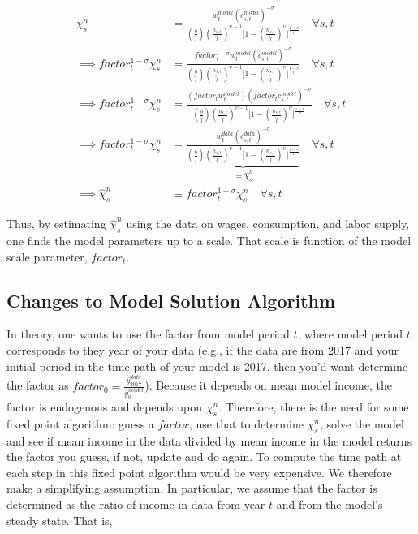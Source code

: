 \documentclass[letterpaper,12pt]{article}
\theoremstyle{definition}
\begin{document}
    \begin{equation}\label{EqChi_ns_model_algebra}
      \begin{split}
        \chi^n_s & = \frac{w^{model}_t\left(c^{model}_{s,t}\right)^{-\sigma}}{\left(\frac{b}{\tilde{l}}\right)\left(\frac{n_{s,t}}{\tilde{l}}\right)^{\upsilon-1}\Biggl[1 - \left(\frac{n_{s,t}}{\tilde{l}}\right)^\upsilon\Biggr]^{\frac{1-\upsilon}{\upsilon}}} \quad\forall s, t \\
        \implies factor^{1-\sigma}_{t} \chi^{n}_{s} & = \frac{factor^{1-\sigma}_{t}w^{model}_t\left(c^{model}_{s,t}\right)^{-\sigma}}{\left(\frac{b}{\tilde{l}}\right)\left(\frac{n_{s,t}}{\tilde{l}}\right)^{\upsilon-1}\Biggl[1 - \left(\frac{n_{s,t}}{\tilde{l}}\right)^\upsilon\Biggr]^{\frac{1-\upsilon}{\upsilon}}} \quad\forall s, t \\
        \implies factor^{1-\sigma}_{t} \chi^{n}_{s} & = \frac{\left(factor_{t}w^{model}_t\right)\left(factor_{t} c^{model}_{s,t}\right)^{-\sigma}}{\left(\frac{b}{\tilde{l}}\right)\left(\frac{n_{s,t}}{\tilde{l}}\right)^{\upsilon-1}\Biggl[1 - \left(\frac{n_{s,t}}{\tilde{l}}\right)^\upsilon\Biggr]^{\frac{1-\upsilon}{\upsilon}}} \quad\forall s, t \\
        \implies factor^{1-\sigma}_{t} \chi^{n}_{s} & = \underbrace{\frac{w^{data}_t\left( c^{data}_{s,t}\right)^{-\sigma}}{\left(\frac{b}{\tilde{l}}\right)\left(\frac{n_{s,t}}{\tilde{l}}\right)^{\upsilon-1}\Biggl[1 - \left(\frac{n_{s,t}}{\tilde{l}}\right)^\upsilon\Biggr]^{\frac{1-\upsilon}{\upsilon}}}}_{=\hat{\chi}^{n}_{s}} \quad\forall s, t \\
        \implies \hat{\chi}^n_s &\equiv factor^{1-\sigma}_{t} \chi^{n}_{s} \quad\forall s, t
      \end{split}
    \end{equation}

    Thus, by estimating $\hat{\chi}^{n}_{s}$ using the data on wages, consumption, and labor supply, one finds the model parameters up to a scale.  That scale is function of the model scale parameter, $factor_{t}$.

    \subsection{Changes to Model Solution Algorithm}
    In theory, one wants to use the factor from model period $t$, where model period $t$ corresponds to they year of your data (e.g., if the data are from 2017 and your initial period in the time path of your model is 2017, then you'd want determine the factor as $factor_{0}=\frac{\bar{y}^{data}_{2017}}{\bar{y}^{model}_{0}}$).  Because it depends on mean model income, the factor is endogenous and depends upon $\chi^{n}_{s}$.  Therefore, there is the need for some fixed point algorithm: guess a $factor$, use that to determine $\chi^{n}_{s}$, solve the model and see if mean income in the data divided by mean income in the model returns the factor you guess, if not, update and do again.  To compute the time path at each step in this fixed point algorithm would be very expensive.  We therefore make a simplifying assumption.  In particular, we assume that the factor is determined as the ratio of income in data from year $t$ and from the model's steady state.  That is,
\end{document}
